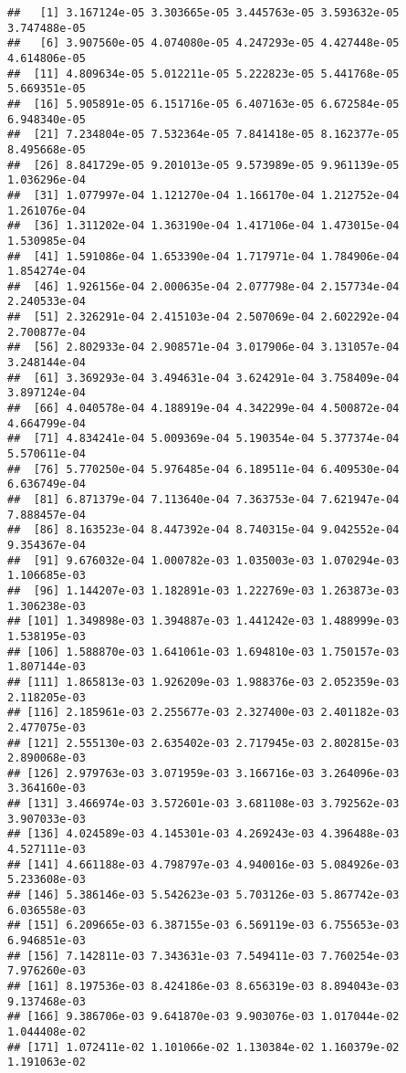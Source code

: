 \documentclass[
]{article}
\begin{document}
\begin{verbatim}
##   [1] 3.167124e-05 3.303665e-05 3.445763e-05 3.593632e-05 3.747488e-05
##   [6] 3.907560e-05 4.074080e-05 4.247293e-05 4.427448e-05 4.614806e-05
##  [11] 4.809634e-05 5.012211e-05 5.222823e-05 5.441768e-05 5.669351e-05
##  [16] 5.905891e-05 6.151716e-05 6.407163e-05 6.672584e-05 6.948340e-05
##  [21] 7.234804e-05 7.532364e-05 7.841418e-05 8.162377e-05 8.495668e-05
##  [26] 8.841729e-05 9.201013e-05 9.573989e-05 9.961139e-05 1.036296e-04
##  [31] 1.077997e-04 1.121270e-04 1.166170e-04 1.212752e-04 1.261076e-04
##  [36] 1.311202e-04 1.363190e-04 1.417106e-04 1.473015e-04 1.530985e-04
##  [41] 1.591086e-04 1.653390e-04 1.717971e-04 1.784906e-04 1.854274e-04
##  [46] 1.926156e-04 2.000635e-04 2.077798e-04 2.157734e-04 2.240533e-04
##  [51] 2.326291e-04 2.415103e-04 2.507069e-04 2.602292e-04 2.700877e-04
##  [56] 2.802933e-04 2.908571e-04 3.017906e-04 3.131057e-04 3.248144e-04
##  [61] 3.369293e-04 3.494631e-04 3.624291e-04 3.758409e-04 3.897124e-04
##  [66] 4.040578e-04 4.188919e-04 4.342299e-04 4.500872e-04 4.664799e-04
##  [71] 4.834241e-04 5.009369e-04 5.190354e-04 5.377374e-04 5.570611e-04
##  [76] 5.770250e-04 5.976485e-04 6.189511e-04 6.409530e-04 6.636749e-04
##  [81] 6.871379e-04 7.113640e-04 7.363753e-04 7.621947e-04 7.888457e-04
##  [86] 8.163523e-04 8.447392e-04 8.740315e-04 9.042552e-04 9.354367e-04
##  [91] 9.676032e-04 1.000782e-03 1.035003e-03 1.070294e-03 1.106685e-03
##  [96] 1.144207e-03 1.182891e-03 1.222769e-03 1.263873e-03 1.306238e-03
## [101] 1.349898e-03 1.394887e-03 1.441242e-03 1.488999e-03 1.538195e-03
## [106] 1.588870e-03 1.641061e-03 1.694810e-03 1.750157e-03 1.807144e-03
## [111] 1.865813e-03 1.926209e-03 1.988376e-03 2.052359e-03 2.118205e-03
## [116] 2.185961e-03 2.255677e-03 2.327400e-03 2.401182e-03 2.477075e-03
## [121] 2.555130e-03 2.635402e-03 2.717945e-03 2.802815e-03 2.890068e-03
## [126] 2.979763e-03 3.071959e-03 3.166716e-03 3.264096e-03 3.364160e-03
## [131] 3.466974e-03 3.572601e-03 3.681108e-03 3.792562e-03 3.907033e-03
## [136] 4.024589e-03 4.145301e-03 4.269243e-03 4.396488e-03 4.527111e-03
## [141] 4.661188e-03 4.798797e-03 4.940016e-03 5.084926e-03 5.233608e-03
## [146] 5.386146e-03 5.542623e-03 5.703126e-03 5.867742e-03 6.036558e-03
## [151] 6.209665e-03 6.387155e-03 6.569119e-03 6.755653e-03 6.946851e-03
## [156] 7.142811e-03 7.343631e-03 7.549411e-03 7.760254e-03 7.976260e-03
## [161] 8.197536e-03 8.424186e-03 8.656319e-03 8.894043e-03 9.137468e-03
## [166] 9.386706e-03 9.641870e-03 9.903076e-03 1.017044e-02 1.044408e-02
## [171] 1.072411e-02 1.101066e-02 1.130384e-02 1.160379e-02 1.191063e-02

\end{verbatim}
\end{document}
